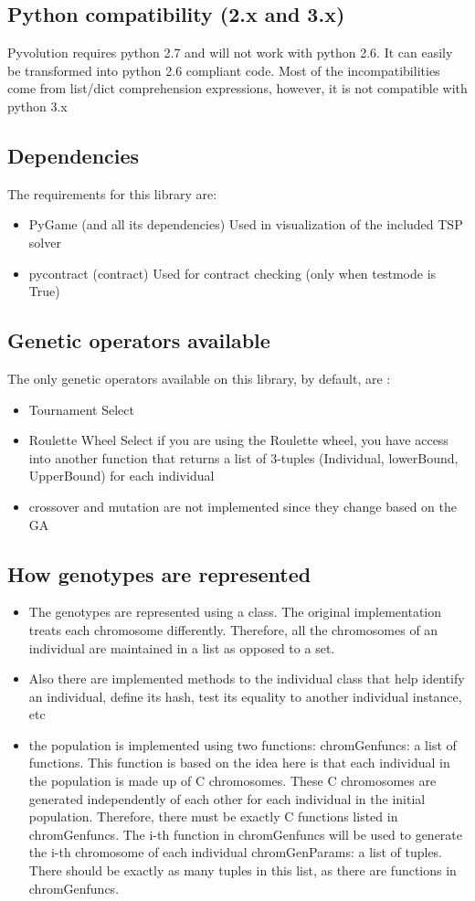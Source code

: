 \documentclass{article}
\begin{document}
\subsection{Python compatibility (2.x and 3.x)}
Pyvolution requires python 2.7 and will not work with python 2.6. It can easily be transformed into python 2.6 compliant code. Most of the incompatibilities come from list/dict comprehension expressions, however, it is not compatible with python 3.x
\subsection{Dependencies}
The requirements for this library are:
\begin{itemize}
    \item PyGame (and all its dependencies)
    \subitem Used in visualization of the included TSP solver
    \item pycontract (contract)
    \subitem Used for contract checking (only when testmode is True)
\end{itemize}
\subsection{Genetic operators available}
The only genetic operators available on this library, by default, are :
\begin{itemize}
    \item Tournament Select
    \item Roulette Wheel Select
    \subitem if you are using the Roulette wheel, you have access into another function that returns a list of 3-tuples  (Individual, lowerBound, UpperBound) for each individual
    \item crossover and mutation are not implemented since they change based on the GA
\end{itemize}
\subsection{How genotypes are represented}
\begin{itemize}
    \item The genotypes are represented using a class.  The original implementation treats each chromosome differently. Therefore, all the chromosomes of an individual are maintained in a list as opposed to a set.
    \item Also there are implemented methods to the individual class that help identify an individual, define its hash, test its equality to another individual instance, etc
    \item the population is implemented using two functions:
        \subitem chromGenfuncs: a list of functions. This function is based on the idea here is that each individual in the population is made up of C chromosomes. These C chromosomes are generated independently of each other for each individual in the initial population. Therefore, there must be exactly C functions listed in chromGenfuncs. The i-th function in chromGenfuncs will be used to generate the i-th chromosome of each individual
        \subitem chromGenParams: a list of tuples. There should be exactly as many tuples in this list, as there are functions in chromGenfuncs. 
\end{itemize}
\end{document}
